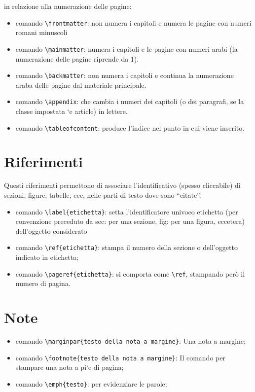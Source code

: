 \documentclass{report}
\begin{document}
            in relazione alla numerazione delle pagine:
            \begin{itemize}
                \item comando \verb!\frontmatter!: non numera i capitoli e numera le pagine con numeri romani minuscoli
                \item comando \verb!\mainmatter!: numera i capitoli e le pagine con numeri arabi (la numerazione delle pagine riprende da 1).
                \item comando \verb!\backmatter!: non numera i capitoli e continua la numerazione araba delle pagine dal materiale principale.
                \item comando \verb!\appendix!: che cambia i numeri dei capitoli (o dei paragrafi, se la classe impostata `e article) in lettere.
                \item comando \verb!\tableofcontent!:  produce l'indice nel punto in cui viene inserito.
            \end{itemize}

        \section{Riferimenti}
            Questi riferimenti permettono di associare l'identificativo (spesso cliccabile) di sezioni, figure, tabelle, ecc, nelle parti di testo dove sono “citate”.
            \begin{itemize}
                \item comando \verb!\label{etichetta}!: setta l'identificatore univoco etichetta (per convenzione preceduto da sec: per una sezione, fig: per una figura, eccetera) dell'oggetto considerato
                \item comando \verb!\ref{etichetta}!: stampa il numero della sezione o dell'oggetto indicato in etichetta;
                \item comando \verb!\pageref{etichetta}!: si comporta come \verb!\ref!, stampando però il numero di pagina.
            \end{itemize}
        
        \section{Note}
            \begin{itemize}
                \item comando \verb!\marginpar{testo della nota a margine}!: Una nota a margine;
                \item comando \verb!\footnote{testo della nota a margine}!: Il comando per stampare una nota a pi`e di pagina;
                \item comando \verb!\emph{testo}!: per evidenziare le parole;
            \end{itemize}
                
\end{document}
